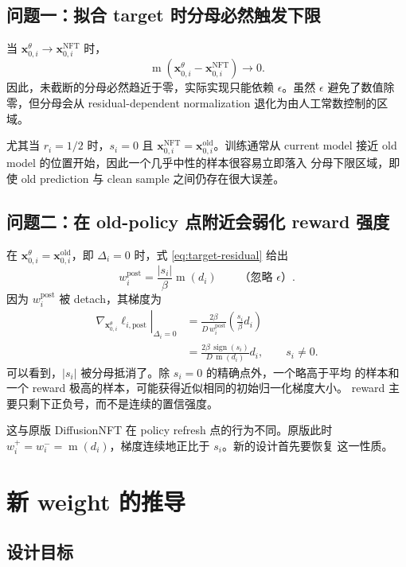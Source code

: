 \documentclass[11pt,a4paper]{article}
\newcommand{\mabs}{\operatorname{m}}
\newcommand{\xcur}{\mathbf{x}_{0,i}^{\theta}}
\newcommand{\xold}{\mathbf{x}_{0,i}^{\mathrm{old}}}
\newcommand{\xtarget}{\mathbf{x}_{0,i}^{\mathrm{NFT}}}
\newcommand{\eps}{\epsilon}
\begin{document}
\subsection{问题一：拟合 target 时分母必然触发下限}

当 $\xcur\rightarrow\xtarget$ 时，
\begin{equation}
\mabs(\xcur-\xtarget)\rightarrow 0.
\end{equation}
因此，未截断的分母必然趋近于零，实际实现只能依赖 $\eps$。虽然
$\eps$ 避免了数值除零，但分母会从 residual-dependent normalization
退化为由人工常数控制的区域。

尤其当 $r_i=1/2$ 时，$s_i=0$ 且 $\xtarget=\xold$。训练通常从 current
model 接近 old model 的位置开始，因此一个几乎中性的样本很容易立即落入
分母下限区域，即使 old prediction 与 clean sample 之间仍存在很大误差。

\subsection{问题二：在 old-policy 点附近会弱化 reward 强度}

在 $\xcur=\xold$，即 $\Delta_i=0$ 时，式 \eqref{eq:target-residual}
给出
\begin{equation}
w_i^{\mathrm{post}}
=
\frac{|s_i|}{\beta}\mabs(d_i)
\qquad
\text{（忽略 $\eps$）}.
\end{equation}
因为 $w_i^{\mathrm{post}}$ 被 detach，其梯度为
\begin{align}
\left.
\nabla_{\xcur}\ell_{i,\mathrm{post}}
\right|_{\Delta_i=0}
&=
\frac{2\beta}{D\,w_i^{\mathrm{post}}}
\left(\frac{s_i}{\beta}d_i\right)
\\
&=
\frac{2\beta\,\operatorname{sign}(s_i)}
{D\,\mabs(d_i)}
d_i,
\qquad s_i\neq 0.
\label{eq:post-gradient}
\end{align}
可以看到，$|s_i|$ 被分母抵消了。除 $s_i=0$ 的精确点外，一个略高于平均
的样本和一个 reward 极高的样本，可能获得近似相同的初始归一化梯度大小。
reward 主要只剩下正负号，而不是连续的置信强度。

这与原版 DiffusionNFT 在 policy refresh 点的行为不同。原版此时
$w_i^+=w_i^-=\mabs(d_i)$，梯度连续地正比于 $s_i$。新的设计首先要恢复
这一性质。

\section{新 weight 的推导}

\subsection{设计目标}
\end{document}

